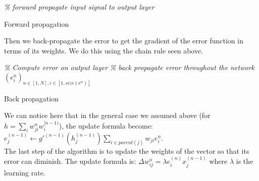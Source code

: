 	\begin{algorithm}[H]
		\BlankLine
		\emph{\% forward propagate input signal to output layer}\;
	\caption{Forward propagation}
	\label{alg:forward_propagation}
	\end{algorithm}
	
	Then we back-propagate the error to get the gradient of the error function in terms of its weights. We do this using the chain rule seen above. 

	\begin{algorithm}[H]
		\BlankLine
		\emph{\% Compute error on output layer}\;
		\emph{\% back propagate error throughout the network}\;
		\Return $(e_i^n)_{n\in[1,N], i\in[1,size(e^n)]}$
	\caption{Back propagation}
	\label{alg:back_propagation}
	\end{algorithm}
	
	We can notice here that in the general case we assumed above (for $h = \sum_i w_{ji}^n w_i^{[n-1)}$), the update formula become: $e_j^{(n-1)} \leftarrow g'^{(n-1)}(h_j^{(n-1)}) \sum_{i\in parent(j)} w_{ji} e_i^{n}$. \\
	The last step of the algorithm is to update the weights of the vector so that its error can diminish. The update formula is: $\Delta w_{ij}^n = \lambda e_i^{(n)} x_j^{(n-1)}$ where $\lambda$ is the learning rate.


